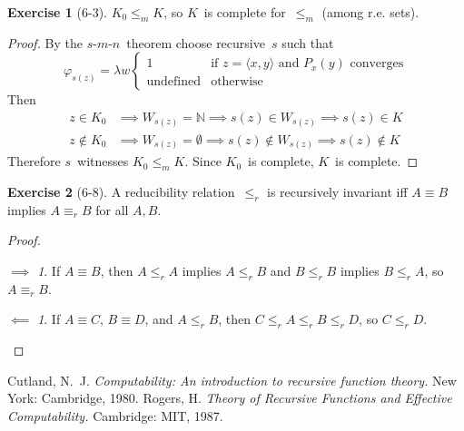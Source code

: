 \documentclass[letterpaper]{article}
\newcommand{\N}{\mathbb{N}}
\newcommand{\iso}{\equiv}
\newcommand{\pair}[2]{\langle{#1},{#2}\rangle}
\newcommand{\smn}{$s$-$m$-$n$}
\theoremstyle{definition}
\newtheorem*{exer}{Exercise}
\theoremstyle{remark}
\theoremstyle{direction}
\newtheorem*{fwd}{$\implies$}
\newtheorem*{bwd}{$\impliedby$}
\begin{document}
\begin{exer}[6-3]
$K_0\le_m K$, so $K$~is complete for~$\le_m$ (among r.e. sets).
\end{exer}
\begin{proof}
By the \smn\ theorem choose recursive~$s$ such that
$$\varphi_{s(z)}=\lambda w\begin{cases}
1&\text{if }z=\pair{x}{y}\text{ and }P_x(y)\text{ converges}\\
\text{undefined}&\text{otherwise}
\end{cases}$$
Then
\begin{align*}
z\in K_0&\implies W_{s(z)}=\N\implies s(z)\in W_{s(z)}\implies s(z)\in K\\
z\not\in K_0&\implies W_{s(z)}=\emptyset\implies s(z)\not\in W_{s(z)}\implies s(z)\not\in K
\end{align*}
Therefore $s$~witnesses $K_0\le_m K$. Since $K_0$~is complete, $K$~is complete.
\end{proof}

\begin{exer}[6-8]
A reducibility relation~$\le_r$ is recursively invariant iff $A\iso B$ implies $A\iso_r B$ for all $A,B$.
\end{exer}
\begin{proof}
\begin{fwd}
If $A\iso B$, then $A\le_r A$ implies $A\le_r B$ and $B\le_r B$ implies $B\le_r A$, so $A\iso_r B$.
\end{fwd}
\begin{bwd}
If $A\iso C$, $B\iso D$, and $A\le_r B$, then $C\le_r A\le_r B\le_r D$, so $C\le_r D$.
\end{bwd}
\end{proof}

\begin{thebibliography}{0}
 Cutland, N.~J. \emph{Computability: An introduction to recursive function theory.} New York: Cambridge, 1980.
 Rogers, H. \emph{Theory of Recursive Functions and Effective Computability.} Cambridge: MIT, 1987.
\end{thebibliography}
\end{document}
